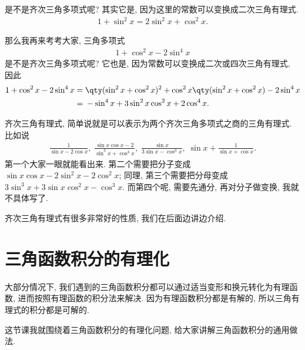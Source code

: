 \documentclass{ctexbook}
\begin{document}
{是不是齐次三角多项式呢? 其实它是, 因为这里的常数可以变换成二次三角有理式. 
\begin{align*}
1+\sin^{2}{x}=2\sin^{2}{x}+\cos^{2}{x}
.\end{align*}\par
那么我再来考考大家, 三角多项式
\begin{align*}
1+\cos^{2}{x}-2\sin^{4}{x}
\end{align*}
是不是齐次三角多项式呢? 它也是, 因为常数可以变换成二次或四次三角有理式, 因此
\begin{align*}
1+\cos^{2}{x}-2\sin^{4}{x}={}&\qty(\sin^{2}{x}+\cos^{2}{x})^{2}+\cos^{2}{x}\qty(\sin^{2}{x}+\cos^{2}{x})-2\sin^{4}{x}\\
={}&-\sin^{4}{x}+3\sin^{2}{x}\cos^{2}{x}+2\cos^{4}{x}
.\end{align*}\par
齐次三角有理式, 简单说就是可以表示为两个齐次三角多项式之商的三角有理式. 比如说
\begin{align*}
\frac{1}{\sin{x}-2\cos{x}},\;\frac{\sin{x}\cos{x}-2}{\sin^{3}{x}+\cos^{3}{x}},\;\frac{\sin{x}}{3\sin{x}-\cos^{3}{x}},\;\sin{x}+\frac{1}{\sin{x}+\cos{x}}
.\end{align*}
第一个大家一眼就能看出来. 第二个需要把分子变成$\sin{x}\cos{x}-2\sin^{2}{x}-2\cos^{2}{x}$; 同理, 第三个需要把分母变成$3\sin^{3}{x}+3\sin{x}\cos^{2}{x}-\cos^{3}{x}$. 而第四个呢, 需要先通分, 再对分子做变换, 我就不具体写了. \par
齐次三角有理式有很多非常好的性质, 我们在后面边讲边介绍. \par
\section{三角函数积分的有理化}
大部分情况下, 我们遇到的三角函数积分都可以通过适当变形和换元转化为有理函数, 进而按照有理函数的积分法来解决. 因为有理函数积分都是有解的, 所以三角有理式的积分都是可解的. \par
这节课我就围绕着三角函数积分的有理化问题, 给大家讲解三角函数积分的通用做法. \par
}
\end{document}

